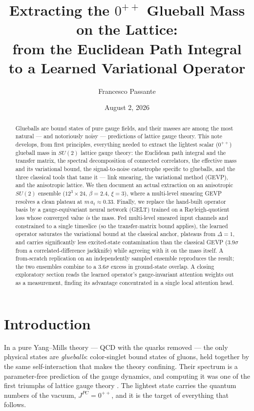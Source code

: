 \documentclass[11pt,a4paper]{article}
\title{Extracting the $0^{++}$ Glueball Mass on the Lattice:\\
from the Euclidean Path Integral to a Learned Variational Operator}
\author{Francesco Passante}
\date{August 2, 2026}
\newcommand{\at}{a_t}
\begin{document}
\maketitle

\begin{abstract}
Glueballs are bound states of pure gauge fields, and their masses are among the
most natural --- and notoriously noisy --- predictions of lattice gauge theory.
This note develops, from first principles, everything needed to extract the
lightest scalar ($0^{++}$) glueball mass in $SU(2)$ lattice gauge theory:
the Euclidean path integral and the transfer matrix, the spectral decomposition
of connected correlators, the effective mass and its variational bound, the
signal-to-noise catastrophe specific to glueballs, and the three classical
tools that tame it --- link smearing, the variational method (GEVP), and the
anisotropic lattice. We then document an actual extraction on an
anisotropic $SU(2)$ ensemble ($12^3\times24$, $\beta=2.4$, $\xi=3$), where a
multi-level smearing GEVP resolves a clean plateau at $m\,\at\approx0.33$.
Finally, we replace the hand-built operator basis by a gauge-equivariant
neural network (GELT) trained on a Rayleigh-quotient loss whose converged
value \emph{is} the mass. Fed multi-level smeared input channels and
constrained to a single timeslice (so the transfer-matrix bound applies), the
learned operator saturates the variational bound at the classical anchor,
plateaus from $\Delta=1$, and carries significantly less excited-state
contamination than the classical GEVP ($3.9\sigma$ from a correlated-difference
jackknife) while agreeing with it on the mass itself. A from-scratch
replication on an independently sampled ensemble reproduces the result;
the two ensembles combine to a $3.6\sigma$ excess in ground-state overlap.
A closing exploratory section reads the learned operator's gauge-invariant
attention weights out as a measurement, finding its advantage concentrated in
a single local attention head.
\end{abstract}

\tableofcontents

\section{Introduction}

In a pure Yang--Mills theory --- QCD with the quarks removed --- the only
physical states are \emph{glueballs}: color-singlet bound states of gluons,
held together by the same self-interaction that makes the theory confining.
Their spectrum is a parameter-free prediction of the gauge dynamics, and
computing it was one of the first triumphs of lattice gauge theory
\cite{Berg1980,MorningstarPeardon1999}. The lightest state carries the quantum
numbers of the vacuum, $J^{PC}=0^{++}$, and it is the target of everything
that follows.
\end{document}
